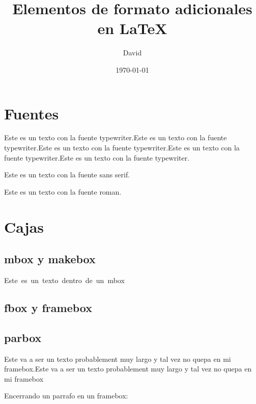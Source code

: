 \documentclass{article}
\title{Elementos de formato adicionales en \LaTeX}
\author{David}
\date{\today}
\begin{document}
	\maketitle
	\tableofcontents
	\section{Fuentes}
		\ttfamily Este es un texto con la fuente typewriter.Este es un texto con la fuente typewriter.Este es un texto con la fuente typewriter.Este es un texto con la fuente typewriter.Este es un texto con la fuente typewriter.
		
		\sffamily Este es un texto con la fuente sans serif.
		
		\rmfamily Este es un texto con la fuente roman.
		
	\section {Cajas}
		\subsection{mbox y makebox}
		
		\mbox{Este es un texto dentro de un mbox} 
		
		
		\subsection{fbox y framebox}
		
		
		
		
		\subsection{parbox}
		
		\parbox{0.5\textwidth}{Este va a ser un texto probablement muy largo y tal vez no quepa en mi framebox.Este va a ser un texto probablement muy largo y tal vez no quepa en mi framebox}
		
		Encerrando un parrafo en un framebox:
		
\end{document}

